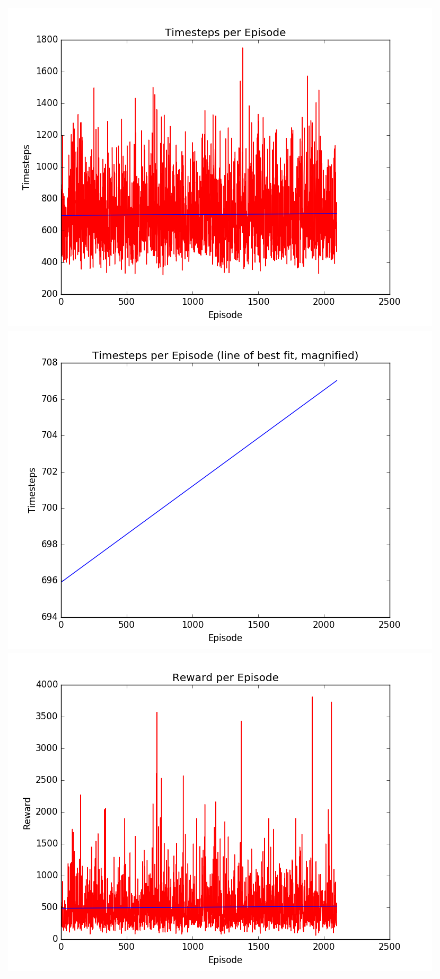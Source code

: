 \documentclass[paper=a4, fontsize=11pt]{scrartcl} %
\numberwithin{equation}{section} %
\numberwithin{figure}{section} %
\numberwithin{table}{section} %
\begin{document}
\begin{figure}[h]
\includegraphics[scale=0.275]{timesteps_learned}
\includegraphics[scale=0.275]{timesteps_learned_line_of_best_fit}
\includegraphics[scale=0.275]{reward_learned}

\end{figure}
\end{document}
